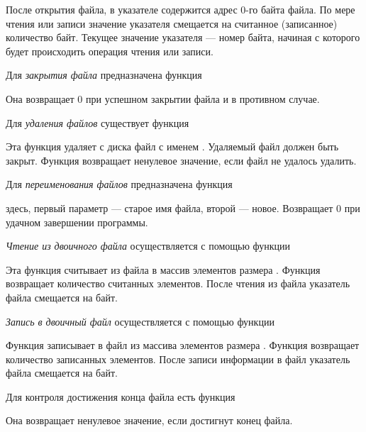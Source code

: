 После открытия файла, в указателе содержится адрес 0-го байта файла. По мере чтения или записи значение указателя
смещается на считанное (записанное) количество байт. Текущее значение указателя --- номер байта, начиная с которого будет
происходить операция чтения или записи.

Для \emph{закрытия файла} предназначена функция


Она возвращает 0 при успешном закрытии файла и  в противном случае.

Для \emph{удаления файлов} существует функция


Эта функция удаляет с диска файл с именем . Удаляемый файл должен быть закрыт. Функция
возвращает ненулевое значение, если файл не удалось удалить.

Для \emph{переименования файлов} предназначена функция


здесь, первый параметр --- старое имя файла, второй --- новое. Возвращает 0 при удачном завершении программы.

\emph{Чтение из двоичного файла} осуществляется с помощью функции


Эта функция считывает из файла  в массив   
элементов размера . Функция возвращает количество считанных элементов. После чтения из файла
указатель файла смещается на  байт.

\emph{Запись в двоичный файл} осуществляется с помощью функции


Функция записывает в файл  из массива   элементов
размера . Функция возвращает количество записанных элементов. После записи информации в файл
указатель файла смещается на  байт.

Для контроля достижения конца файла есть функция


Она возвращает ненулевое значение, если достигнут конец файла.

